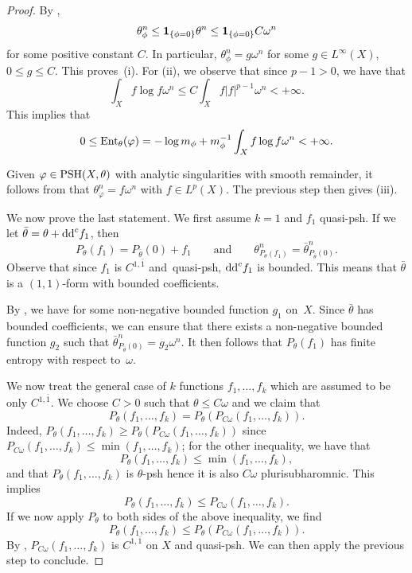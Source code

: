 \documentclass[pdftex]{sigma}
\numberwithin{equation}{section}
\theoremstyle{plain}
\newcommand \psh {{\rm PSH}}
\newcommand \Ent{{\rm Ent}}
\begin{document}
\begin{proof}
By \cite[Theorem~3.6]{DDL6},
\[\theta_\phi^n\leq {\bf 1}_{\{\phi=0\}} \theta^n\leq {\bf 1}_{\{\phi=0\}} C \omega^n\] for some positive constant $C$.
In particular, $\theta_\phi^n=g\omega^n$ for some $g\in L^\infty (X)$, $0\leq g \leq C$. This proves~(i). For (ii), we observe that since $p-1>0$, we have that
\[\int_X f \log f \omega^n \leq C \int_X f |f|^{p-1} \omega^n<+\infty. \]
 This implies that
 \[0\leq \Ent_\theta(\varphi)= -\log m_\phi + m_\phi^{-1} \int_X f \log f \omega^n<+\infty.\]

Given $\varphi\in \psh(X, \theta)$ with analytic singularities with smooth remainder, it follows from \cite[Proposition~4.36]{DDL2} that $\theta_\varphi^n= f\omega^n$ with $f\in L^p(X)$. The previous step then gives (iii).

We now prove the last statement. We first assume $k =1 $ and $f_1$ quasi-psh. If we let $\bar{\theta} = \theta + {\rm dd}^c f_1$, then
\[
P_\theta(f_1) = P_{\bar{\theta}}(0)+ f_1 \qquad \text{and}\qquad  \theta_{P_\theta(f_1)}^n = \bar{\theta}_{P_{\bar{\theta}}(0)}^n.
\]
 Observe that since $f_1$ is $C^{1,\bar{1}}$ and~quasi-psh, ${\rm dd}^c f_1$ is bounded. This means that $\bar{\theta}$ is a $(1,1)$-form with bounded coefficients.

 By \cite[Corollary 3.4\,(i)]{DNT21}, we have
  for some non-negative bounded function $g_1$ on~$X$. Since $ \bar{\theta}$ has bounded coefficients, we can ensure that there exists a non-negative bounded function $g_2$ such that $\bar{\theta}_{P_{\bar{\theta}}(0)}^n = g_2 \omega^n$. It then follows that $P_{\theta}(f_1)$ has finite entropy with respect to~$\omega$.

 We now treat the general case of $k$ functions $f_1, \dots,f_k$ which are assumed to be only $C^{1,\bar{1}}$. We choose $C > 0$ such that $\theta \leq C \omega$ and we claim that
\[P_\theta(f_1,\dots,f_k) = P_{\theta}(P_{C \omega}(f_1,\dots,f_k)).\]
Indeed, $P_\theta(f_1,\dots,f_k) \geq P_{\theta}(P_{C \omega}(f_1,\dots,f_k))$ since $ P_{C \omega}(f_1,\dots,f_k)\leq \min (f_1,\dots,f_k)$; for the other inequality, we have that
\[P_{\theta}(f_1,\dots,f_k) \leq \min (f_1,\dots,f_k),\]
and that $P_{\theta}(f_1,\dots,f_k)$ is $\theta$-psh hence it is also $C \omega$ plurisubharomnic. This implies
\[P_{\theta}(f_1,\dots,f_k) \leq P_{C \omega}(f_1,\dots,f_k).\]
If we now apply $P_\theta$ to both sides of the above inequality, we find
\[P_{\theta}(f_1,\dots,f_k) \leq P_\theta(P_{C \omega}(f_1,\dots,f_k)).\]
 By \cite[Theorem 2.5]{DR16}, $P_{C \omega}(f_1,\dots,f_k)$ is $C^{1,\bar{1}}$ on $X$ and quasi-psh. We can then apply the previous step to conclude.
\end{proof}
\end{document}
